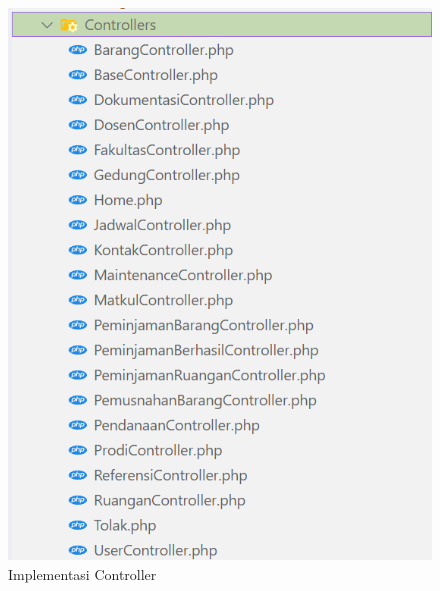 \begin{figure}
	\centering
	\includegraphics[width=0.82\linewidth]{konten//gambar/implementasi-folder/folder-controller.png}
	\caption{Implementasi Controller}
	\label{fig:implementasi-controller}
\end{figure}
